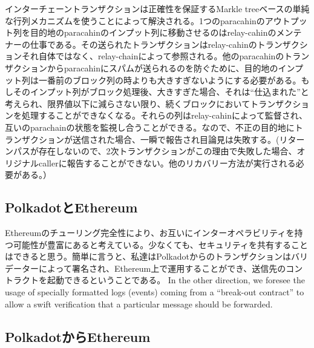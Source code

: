 インターチェーントランザクションは正確性を保証するMarkle
treeベースの単純な行列メカニズムを使うことによって解決される。1つのparacahinのアウトプット列を目的地のparacahinのインプット列に移動させるのはrelay-cahinのメンテナーの仕事である。その送られたトランザクションはrelay-cahinのトランザクションそれ自体ではなく、relay-chainによって参照される。他のparacahinのトランザクションからparacahinにスパムが送られるのを防ぐために、目的地のインプット列は一番前のブロック列の時よりも大きすぎないようにする必要がある。もしそのインプット列がブロック処理後、大きすぎた場合、それは``仕込まれた''と考えられ、限界値以下に減らさない限り、続くブロックにおいてトランザクションを処理することができなくなる。それらの列はrelay-cahinによって監督され、互いのparachainの状態を監視し合うことができる。なので、不正の目的地にトランザクションが送信された場合、一瞬で報告され目論見は失敗する。(リターンパスが存在しないので、2次トランザクションがこの理由で失敗した場合、オリジナルcallerに報告することができない。他のリカバリー方法が実行される必要がある。）

\hypertarget{polkadotux3068ethereum}{%
\subsection{PolkadotとEthereum}\label{polkadotux3068ethereum}}

Ethereumのチューリング完全性により、お互いにインターオペラビリティを持つ可能性が豊富にあると考えている。少なくても、セキュリティを共有することはできると思う。簡単に言うと、私達はPolkadotからのトランザクションはバリデーターによって署名され、Ethereum上で運用することができ、送信先のコントラクトを起動できるということである。
In the other direction, we foresee the usage of specially formatted logs
(events) coming from a ``break-out contract'' to allow a swift
verification that a particular message should be forwarded.

\hypertarget{polkadotux304bux3089ethereum}{%
\subsection{PolkadotからEthereum}\label{polkadotux304bux3089ethereum}}

